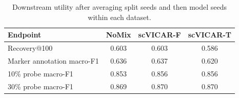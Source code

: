 \begin{table}[t]
\centering
\footnotesize
\setlength{\tabcolsep}{3pt}
\caption{Downstream utility after averaging split seeds and then model seeds within each dataset.}
\label{tab:downstream_overall}
\begin{tabular}{lccc}
\toprule
Endpoint & NoMix & scVICAR-F & scVICAR-T \\
\midrule
Recovery@100 & 0.603 & 0.603 & 0.586 \\
Marker annotation macro-F1 & 0.636 & 0.637 & 0.620 \\
10\% probe macro-F1 & 0.853 & 0.856 & 0.856 \\
30\% probe macro-F1 & 0.869 & 0.870 & 0.870 \\
\bottomrule
\end{tabular}
\end{table}
